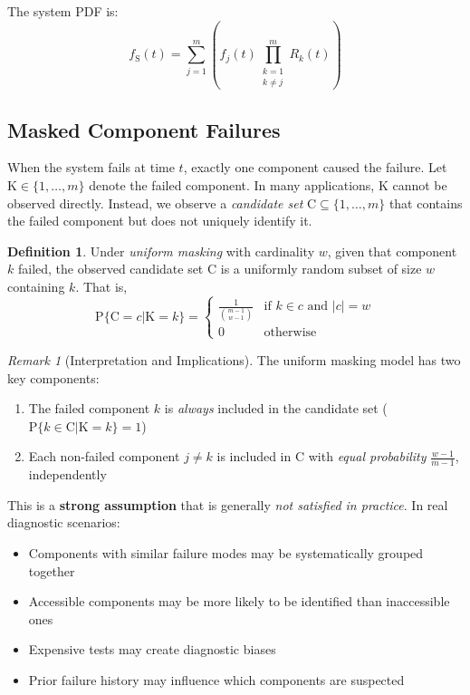 \documentclass[12pt]{article}
\newcommand{\RV}[1]{\mathrm{#1}}
\newcommand{\Prob}[1]{\mathrm{P}\{#1\}}
\newcommand{\sv}{\RV{S}}           %
\newcommand{\cand}{\RV{C}}         %
\newcommand{\pdf}{f}
\newcommand{\srv}{R}
\newcommand{\spdf}{\pdf_{\sv}}
\theoremstyle{definition}
\newtheorem{definition}[theorem]{Definition}
\theoremstyle{remark}
\newtheorem{remark}[theorem]{Remark}
\begin{document}
The system PDF is:
\begin{equation}
\label{eq:system_pdf}
\spdf(t) = \sum_{j=1}^{m} \left(\pdf_j(t) \prod_{\substack{k=1\\k \neq j}}^{m} \srv_k(t)\right)
\end{equation}

\subsection{Masked Component Failures}

When the system fails at time $t$, exactly one component caused the failure. Let $\RV{K} \in \{1, \ldots, m\}$ denote the failed component. In many applications, $\RV{K}$ cannot be observed directly. Instead, we observe a \emph{candidate set} $\cand \subseteq \{1, \ldots, m\}$ that contains the failed component but does not uniquely identify it.

\begin{definition}
\label{def:uniform_masking}
Under \emph{uniform masking} with cardinality $w$, given that component $k$ failed, the observed candidate set $\cand$ is a uniformly random subset of size $w$ containing $k$. That is,
\begin{equation}
\Prob{\cand = c | \RV{K} = k} = \begin{cases}
\frac{1}{\binom{m-1}{w-1}} & \text{if } k \in c \text{ and } |c| = w \\
0 & \text{otherwise}
\end{cases}
\end{equation}
\end{definition}

\begin{remark}[Interpretation and Implications]
The uniform masking model has two key components:
\begin{enumerate}
\item The failed component $k$ is \emph{always} included in the candidate set ($\Prob{k \in \cand | \RV{K} = k} = 1$)
\item Each non-failed component $j \neq k$ is included in $\cand$ with \emph{equal probability} $\frac{w-1}{m-1}$, independently
\end{enumerate}

This is a \textbf{strong assumption} that is generally \emph{not satisfied in practice}. In real diagnostic scenarios:
\begin{itemize}
\item Components with similar failure modes may be systematically grouped together
\item Accessible components may be more likely to be identified than inaccessible ones
\item Expensive tests may create diagnostic biases
\item Prior failure history may influence which components are suspected
\end{itemize}
\end{remark}
\end{document}
